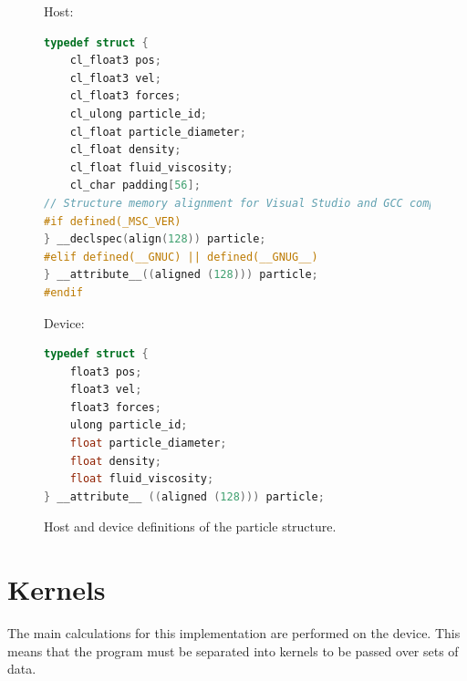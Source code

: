 \documentclass[10pt,a4paper,titlepage]{report}
\begin{document}
\begin{figure}[!ht]
Host:
\begin{lstlisting}[language=C]
typedef struct {
    cl_float3 pos;
    cl_float3 vel;
    cl_float3 forces;
    cl_ulong particle_id;
    cl_float particle_diameter;
    cl_float density;
    cl_float fluid_viscosity;
    cl_char padding[56];
// Structure memory alignment for Visual Studio and GCC compilers.
#if defined(_MSC_VER)
} __declspec(align(128)) particle;
#elif defined(__GNUC) || defined(__GNUG__)
} __attribute__((aligned (128))) particle;
#endif
\end{lstlisting}
Device:
\begin{lstlisting}[language=C]
typedef struct {
    float3 pos;
    float3 vel;
    float3 forces;
    ulong particle_id;
    float particle_diameter;
    float density;
    float fluid_viscosity;
} __attribute__ ((aligned (128))) particle;
\end{lstlisting}
\caption{Host and device definitions of the particle structure.}
\label{fig:struct_definitions}
\end{figure}
\section{Kernels}
The main calculations for this implementation are performed on the device. This means that the program must be separated into kernels to be passed over sets of data.
\end{document}
